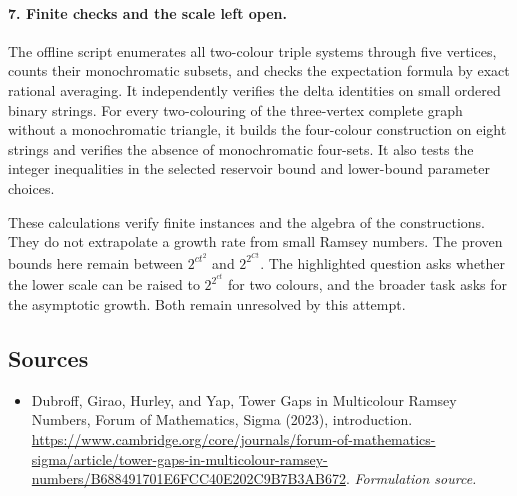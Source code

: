 \documentclass[11pt]{article}
\begin{document}
\paragraph{7. Finite checks and the scale left open.}
The offline script enumerates all two-colour triple systems through five vertices, counts their monochromatic subsets, and checks the expectation formula by exact rational averaging. It independently verifies the delta identities on small ordered binary strings. For every two-colouring of the three-vertex complete graph without a monochromatic triangle, it builds the four-colour construction on eight strings and verifies the absence of monochromatic four-sets. It also tests the integer inequalities in the selected reservoir bound and lower-bound parameter choices.

These calculations verify finite instances and the algebra of the constructions. They do not extrapolate a growth rate from small Ramsey numbers. The proven bounds here remain between $2^{ct^2}$ and $2^{2^{Ct}}$. The highlighted question asks whether the lower scale can be raised to $2^{2^{ct}}$ for two colours, and the broader task asks for the asymptotic growth. Both remain unresolved by this attempt.

\subsection{Sources}
\begin{itemize}
\item[S1]Dubroff, Girao, Hurley, and Yap, Tower Gaps in Multicolour Ramsey Numbers, Forum of Mathematics, Sigma (2023), introduction.
\url{https://www.cambridge.org/core/journals/forum-of-mathematics-sigma/article/tower-gaps-in-multicolour-ramsey-numbers/B688491701E6FCC40E202C9B7B3AB672}.
\textit{Formulation source.}
\end{itemize}
\end{document}
